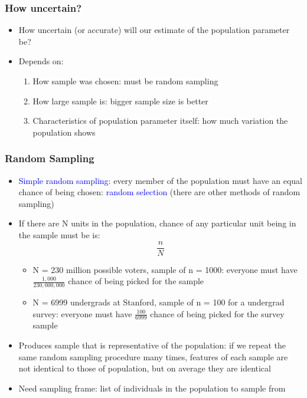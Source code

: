 \documentclass{beamer}
\newcommand{\blue}{\textcolor{blue}}
\begin{document}
\begin{frame}
 \frametitle{How uncertain?}
 \begin{itemize}[<+->]
   \item How uncertain (or accurate) will our estimate of the population parameter be?
   \item Depends on:
     \begin{enumerate}     
      \item How sample was \alert{chosen}: must be \alert{random} sampling
      \item How \alert{large} sample is: \alert{bigger} sample size is better
      \item Characteristics of population parameter itself: how much \alert{variation} the population shows 
     \end{enumerate}
 \end{itemize}
\end{frame}

\begin{frame}
 \frametitle{Random Sampling}
 \begin{itemize}[<+->]
   \item \blue{Simple random sampling}: every member of the population must have an \alert{equal chance} of being chosen: \blue{random selection}  (there are other methods of random sampling)
   \item If there are N units in the population, chance of any particular unit being in the sample must be is:
         $$ \frac{n}{N}$$
     \begin{itemize}     
      \item N = 230 million possible voters, sample of n = 1000: everyone must have $\frac{1,000}{230,000,000}$ chance of being picked for the sample
      \item N = 6999 undergrads at Stanford, sample of n = 100 for a undergrad survey: everyone must have $\frac{100}{6999}$ chance of being picked for the survey sample
     \end{itemize}
   \item Produces sample that is \alert{representative} of the population: if we repeat the same random sampling procedure many times, features of each sample are not identical to those of population, but on average they are identical
   \item Need \alert{sampling frame}: list of individuals in the population to sample from
 \end{itemize}
\end{frame}
\end{document}
